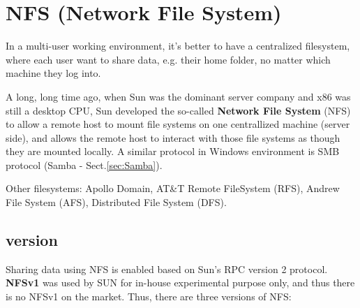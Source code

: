 \section{NFS (Network File System)}
\label{sec:NFS}

In a multi-user working environment, it's better to have a centralized
filesystem, where each user want to share data, e.g. their home folder, no
matter which machine they log into.

A long, long time ago, when Sun was the dominant server company and x86 was
still a desktop CPU, Sun developed the so-called {\bf Network File System} (NFS)
to allow a remote host to mount file systems on one centrallized machine (server
side), and allows the remote host to interact with those file systems as though
they are mounted locally. A similar protocol in Windows environment is SMB
protocol (Samba - Sect.\ref{sec:Samba}).

Other filesystems: 
Apollo Domain, AT\&T Remote FileSystem (RFS), Andrew File System (AFS),
Distributed File System (DFS).


\subsection{version}

Sharing data using NFS is enabled based on Sun's RPC version 2 protocol.
{\bf NFSv1} was used by SUN for in-house experimental purpose only, and thus
there is no NFSv1 on the market. Thus, there are three versions of NFS:

